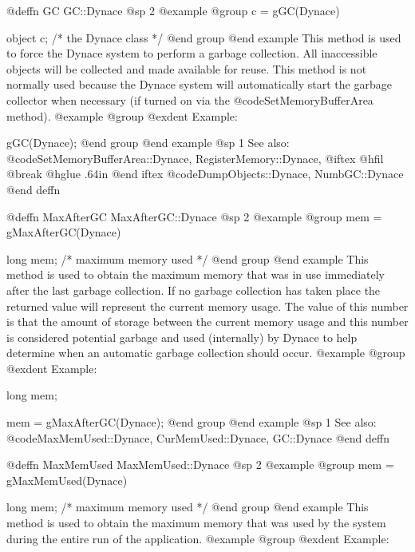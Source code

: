 @deffn {GC} GC::Dynace
@sp 2
@example
@group
c = gGC(Dynace)

object  c;    /*  the Dynace class  */
@end group
@end example
This method is used to force the Dynace system to perform a garbage collection.
All inaccessible objects will be collected and made available for reuse.
This method is not normally used because the Dynace system will automatically
start the garbage collector when necessary (if turned on via the
@code{SetMemoryBufferArea} method).
@example
@group
@exdent Example:

gGC(Dynace);
@end group
@end example
@sp 1
See also:  @code{SetMemoryBufferArea::Dynace, RegisterMemory::Dynace,}
@iftex
@hfil @break @hglue .64in    
@end iftex
@code{DumpObjects::Dynace, NumbGC::Dynace}
@end deffn











@deffn {MaxAfterGC} MaxAfterGC::Dynace
@sp 2
@example
@group
mem = gMaxAfterGC(Dynace)

long    mem;    /*  maximum memory used  */
@end group
@end example
This method is used to obtain the maximum memory that was in use
immediately after the last garbage collection.  If no garbage
collection has taken place the returned value will represent
the current memory usage.  The value of this number is that
the amount of storage between the current memory usage and this number
is considered potential garbage and used (internally) by Dynace
to help determine when an automatic garbage collection should occur.
@example
@group
@exdent Example:

long    mem;

mem = gMaxAfterGC(Dynace);
@end group
@end example
@sp 1
See also:  @code{MaxMemUsed::Dynace, CurMemUsed::Dynace, GC::Dynace}
@end deffn


















@deffn {MaxMemUsed} MaxMemUsed::Dynace
@sp 2
@example
@group
mem = gMaxMemUsed(Dynace)

long    mem;    /*  maximum memory used  */
@end group
@end example
This method is used to obtain the maximum memory that was
used by the system during the entire run of the application.
@example
@group
@exdent Example:


